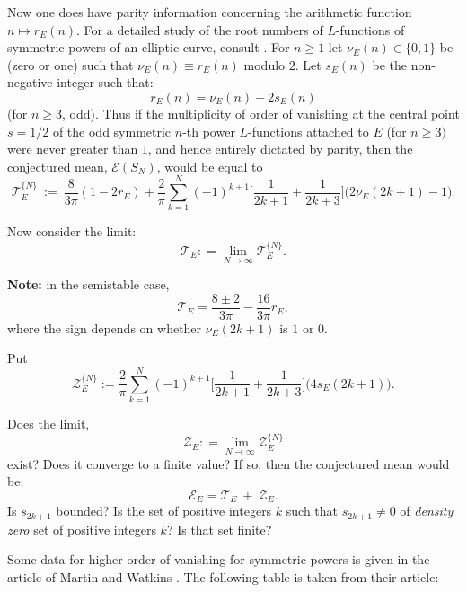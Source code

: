 \documentclass[11pt]{article}
\theoremstyle{plain}
\theoremstyle{definition}
\newtheorem{project}[theorem]{Project}
\numberwithin{equation}{section}
\numberwithin{figure}{section}
\numberwithin{table}{section}
\def\z{{\mathcal Z}}
\begin{document}
Now one does have  parity information concerning the arithmetic function $n \mapsto r_E(n)$. For a detailed study of the root numbers of $L$-functions of symmetric powers of an elliptic curve, consult \cite{DMW}.
 For $n \ge 1$ let $ \nu_E(n) \in \{0,1\}$ be (zero or one) such that  $ \nu_E(n) \equiv r_E(n)$ modulo $2$. Let $s_E(n)$ be the non-negative integer such that:
 $$r_E(n) = \nu_E(n) + 2s_E(n)$$  (for $n\ge 3$, odd).
Thus if the multiplicity of order of vanishing at the central point $s=1/2$ of the odd symmetric $n$-th power $L$-functions attached to $E$ (for $n \ge 3)$ were never greater than  $1$, and hence entirely dictated by parity, then the conjectured mean, ${\mathcal E}(S_N)$, would be equal to
\begin{equation}\label{min}
{\mathcal T}_E^{\{N\}}\ := \ {\frac{8}{3\pi}}(1-2r_E) + {\frac{2}{\pi}} \sum_{k=1}^{N}  (-1)^{k+1}\big[{\frac{1}{2k+1}} + {\frac{1}{2k+3}}\big]\big(2\nu_E(2k+1)-1\big).
\end{equation}

  Now consider the limit:
   $${\mathcal T}_E: = \lim_{N\to \infty}{\mathcal T}_E^{\{N\}}. $$
\vskip20pt

{\bf Note:}  in the semistable case, $${\mathcal T}_E = {\frac{8\pm 2}{3\pi}} -{\frac{16}{3\pi}}r_E,$$ where the sign depends on whether  $\nu_E(2k+1)$ is $1$ or $0$.%
\vskip20pt


Put $${\z}_E^{\{N\}}:= {\frac{2}{\pi}}\sum_{k=1}^{N}  (-1)^{k+1}\big[{\frac{1}{2k+1}} + {\frac{1}{2k+3}}\big]\big(4s_E(2k+1)\big).$$

\vskip20pt
 Does the limit, $${\z}_E: = \lim_{N\to \infty}{\z}_E^{\{N\}} $$  exist? Does it converge to a finite value?  If so, then the conjectured mean would be:
$${\mathcal E}_E =  {\mathcal T}_E \ + \ \z_E.$$   Is $s_{2k+1}$ bounded?  Is  the set of positive integers $k$ such that  $s_{2k+1} \ne 0$ of {\it density zero} set of positive integers $k$?    Is that set finite?



 Some data for higher order of vanishing for symmetric powers is given in the article of Martin and Watkins \cite{M-W}. The following table is taken from their article:
\end{document}
